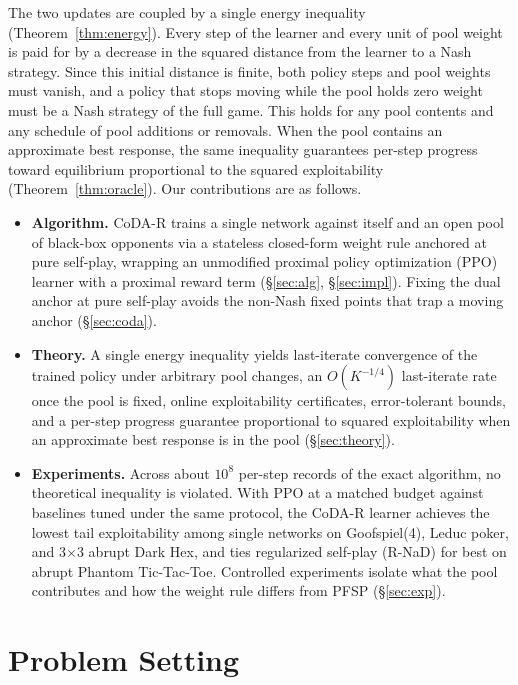 \documentclass{article}
\theoremstyle{plain}
\theoremstyle{remark}
\newcommand{\codar}{CoDA-R}
\begin{document}
The two updates are coupled by a single energy inequality (Theorem~\ref{thm:energy}). Every step of the learner and every unit of pool weight is paid for by a decrease in the squared distance from the learner to a Nash strategy. Since this initial distance is finite, both policy steps and pool weights must vanish, and a policy that stops moving while the pool holds zero weight must be a Nash strategy of the full game. This holds for any pool contents and any schedule of pool additions or removals. When the pool contains an approximate best response, the same inequality guarantees per-step progress toward equilibrium proportional to the squared exploitability (Theorem~\ref{thm:oracle}). Our contributions are as follows.
\begin{itemize}
\item \textbf{Algorithm.} \codar{} trains a single network against itself and an open pool of black-box opponents via a stateless closed-form weight rule anchored at pure self-play, wrapping an unmodified proximal policy optimization (PPO)~\citep{schulman2017ppo} learner with a proximal reward term (\S\ref{sec:alg}, \S\ref{sec:impl}). Fixing the dual anchor at pure self-play avoids the non-Nash fixed points that trap a moving anchor (\S\ref{sec:coda}).
\item \textbf{Theory.} A single energy inequality yields last-iterate convergence of the trained policy under arbitrary pool changes, an $O(K^{-1/4})$ last-iterate rate once the pool is fixed, online exploitability certificates, error-tolerant bounds, and a per-step progress guarantee proportional to squared exploitability when an approximate best response is in the pool (\S\ref{sec:theory}).
\item \textbf{Experiments.} Across about $10^8$ per-step records of the exact algorithm, no theoretical inequality is violated. With PPO at a matched budget against baselines tuned under the same protocol, the \codar{} learner achieves the lowest tail exploitability among single networks on Goofspiel(4), Leduc poker, and 3$\times$3 abrupt Dark Hex, and ties regularized self-play (R-NaD) for best on abrupt Phantom Tic-Tac-Toe. Controlled experiments isolate what the pool contributes and how the weight rule differs from PFSP (\S\ref{sec:exp}).
\end{itemize}

\section{Problem Setting}
\label{sec:prelim}
\end{document}
